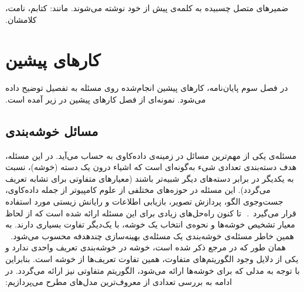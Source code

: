 ‫
‫
‫ضمیرهای متصل چسبیده به کلمه‌ی پیش‌ از خود نوشته می‌شوند. مانند: کتابم، نامت، کلامشان.
‫
‫
‫
‫
‫‫
‫
‫\section{کارهای پیشین}
‫
‫در فصل سوم پایان‌نامه، کارهای پیشین انجام‌شده روی مسئله به تفصیل توضیح داده می‌شود.
‫نمونه‌ای از فصل کارهای پیشین در زیر آمده است.
‫
‫
‫\subsection{مسائل خوشه‌بندی}
‫
‫مسئله‌ی  یکی از مهم‌ترین مسائل در زمینه‌ی داده‌کاوی به حساب می‌آید.
‫در این مسئله، هدف دسته‌بندی تعدادی شیء به‌گونه‌ای است که اشیاء درون یک دسته (خوشه)، نسبت به یکدیگر در برابر دسته‌های دیگر شبیه‌تر باشند (معیارهای متفاوتی برای تشابه تعریف می‌گردد).
‫این مسئله در حوزه‌های مختلفی از علوم کامپیوتر از جمله داده‌کاوی، جست‌وجوی الگو، پردازش تصویر، بازیابی اطلاعات و رایانش زیستی مورد استفاده قرار می‌گیرد~.
‫
‫تا کنون راه‌حل‌های زیادی برای این مسئله ارائه شده است که از لحاظ معیار تشخیص خوشه‌ها و نحوه‌ی انتخاب یک خوشه، با یک‌دیگر تفاوت بسیاری دارند.
‫به همین خاطر مسئله‌ی خوشه‌بندی یک مسئله‌ی بهینه‌سازی چندهدفه محسوب می‌شود.
‫
‫
‫همان طور که در مرجع  ذکر شده است، خوشه در خوشه‌بندی تعریف واحدی ندارد و یکی از دلایل وجود الگوریتم‌های متفاوت، همین تفاوت تعریف‌ها از خوشه است.
‫بنابراین با توجه به مدلی که برای خوشه‌ها ارائه می‌شود، الگوریتم متفاوتی نیز ارائه می‌گردد.
‫در ادامه به بررسی تعدادی از معروف‌ترین مدل‌های مطرح می‌پردازیم:
‫
‫
‫
‫
‫
‫
‫
‫
‫
‫
